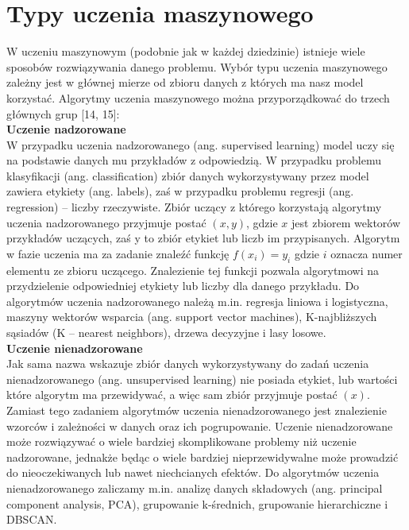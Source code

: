 \documentclass[a4paper,12pt,oneside]{book}
\begin{document}
\section{Typy uczenia maszynowego}
W uczeniu maszynowym (podobnie jak w każdej dziedzinie) istnieje wiele sposobów rozwiązywania danego problemu. Wybór typu uczenia maszynowego zależny jest w głównej mierze od zbioru danych z których ma nasz model korzystać. Algorytmy uczenia maszynowego można przyporządkować do trzech głównych grup [14, 15]:\\
\textbf{Uczenie nadzorowane}\\
      W przypadku uczenia nadzorowanego (ang. supervised learning)  model uczy się na podstawie danych mu przykładów z odpowiedzią. W przypadku problemu klasyfikacji (ang. classification) zbiór danych wykorzystywany przez model zawiera etykiety (ang. labels),  zaś w przypadku problemu regresji (ang. regression) – liczby rzeczywiste. Zbiór uczący z którego korzystają algorytmy uczenia nadzorowanego przyjmuje postać $(x, y)$, gdzie $x$ jest zbiorem wektorów przykładów uczących, zaś y to zbiór etykiet lub liczb im przypisanych. Algorytm w fazie uczenia ma za zadanie znaleźć funkcję $f\left(x_i\right)=y_i$ gdzie $i$ oznacza numer elementu ze zbioru uczącego. Znalezienie tej funkcji pozwala algorytmowi na przydzielenie odpowiedniej etykiety lub liczby dla danego przykładu. Do algorytmów uczenia nadzorowanego należą m.in. regresja liniowa i logistyczna, maszyny wektorów wsparcia (ang. support vector machines), K-najbliższych sąsiadów (K – nearest neighbors), drzewa decyzyjne i  lasy losowe. \\

\textbf{Uczenie nienadzorowane}\\
      Jak sama nazwa wskazuje zbiór danych wykorzystywany do zadań uczenia nienadzorowanego (ang. unsupervised learning) nie posiada etykiet, lub wartości które algorytm ma przewidywać, a więc sam zbiór przyjmuje postać $(x)$. Zamiast tego zadaniem algorytmów uczenia nienadzorowanego jest znalezienie wzorców i zależności w danych oraz ich pogrupowanie. Uczenie nienadzorowane może rozwiązywać o wiele bardziej skomplikowane problemy niż uczenie nadzorowane, jednakże będąc o wiele bardziej nieprzewidywalne może prowadzić do nieoczekiwanych lub nawet niechcianych efektów. Do algorytmów uczenia nienadzorowanego zaliczamy m.in. analizę danych składowych (ang. principal component analysis, PCA), grupowanie k-średnich, grupowanie hierarchiczne i  DBSCAN.\\
\end{document}
